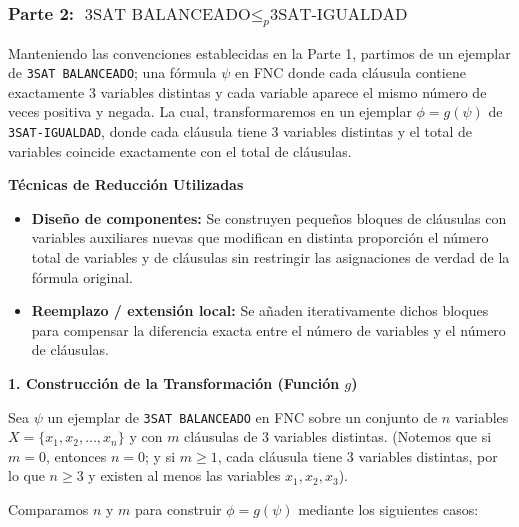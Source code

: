\subsubsection*{Parte 2: $\text{3SAT BALANCEADO} \le_p \text{3SAT-IGUALDAD}$}

Manteniendo las convenciones establecidas en la Parte 1, partimos de un ejemplar de \texttt{3SAT BALANCEADO}; una fórmula $\psi$ en FNC donde cada cláusula contiene exactamente $3$ variables distintas y cada variable aparece el mismo número de veces positiva y negada. La cual, transformaremos en un ejemplar $\phi = g(\psi)$ de \texttt{3SAT-IGUALDAD}, donde cada cláusula tiene $3$ variables distintas y el total de variables coincide exactamente con el total de cláusulas.

\vspace{0.3cm}
\noindent\textbf{Técnicas de Reducción Utilizadas}

\begin{itemize}[leftmargin=*]
    \item \textbf{Diseño de componentes:} Se construyen pequeños bloques de cláusulas con variables auxiliares nuevas que modifican en distinta proporción el número total de variables y de cláusulas sin restringir las asignaciones de verdad de la fórmula original.

    \item \textbf{Reemplazo / extensión local:} Se añaden iterativamente dichos bloques para compensar la diferencia exacta entre el número de variables y el número de cláusulas.
\end{itemize}

\vspace{0.3cm}
\noindent\textbf{1. Construcción de la Transformación (Función $g$)}

Sea $\psi$ un ejemplar de \texttt{3SAT BALANCEADO} en FNC sobre un conjunto de $n$ variables $X = \{x_1, x_2, \dots, x_n\}$ y con $m$ cláusulas de $3$ variables distintas. (Notemos que si $m = 0$, entonces $n = 0$; y si $m \ge 1$, cada cláusula tiene $3$ variables distintas, por lo que $n \ge 3$ y existen al menos las variables $x_1, x_2, x_3$).

Comparamos $n$ y $m$ para construir $\phi = g(\psi)$ mediante los siguientes casos:


